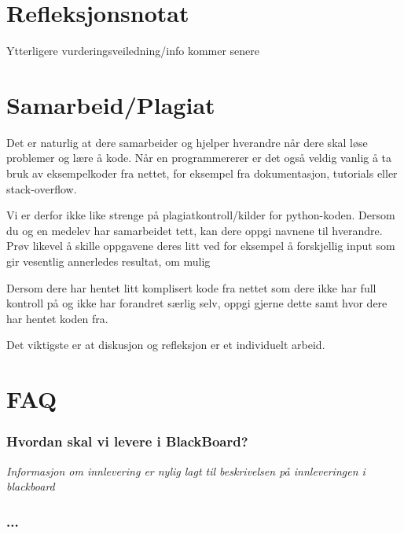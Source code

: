 \documentclass[12pt, titlepage]{article}
\begin{document}
\section*{Refleksjonsnotat}

Ytterligere vurderingsveiledning/info kommer senere

\section*{Samarbeid/Plagiat}

Det er naturlig at dere samarbeider og hjelper hverandre når dere skal løse problemer og lære å kode.
Når en programmererer er det også veldig vanlig å ta bruk av eksempelkoder fra nettet, for eksempel fra dokumentasjon, tutorials eller stack-overflow.

Vi er derfor ikke like strenge på plagiatkontroll/kilder for python-koden.  
Dersom du og en medelev har samarbeidet tett, kan dere oppgi navnene til hverandre. 
Prøv likevel å skille oppgavene deres litt ved for eksempel å forskjellig input som gir vesentlig annerledes resultat, om mulig

Dersom dere har hentet litt komplisert kode fra nettet som dere ikke har full kontroll på og ikke har forandret særlig selv,
oppgi gjerne dette samt hvor dere har hentet koden fra.

Det viktigste er at diskusjon og refleksjon er et individuelt arbeid.



\section*{FAQ}

\subsubsection*{Hvordan skal vi levere i BlackBoard?}
\textit{Informasjon om innlevering er nylig lagt til beskrivelsen på innleveringen i blackboard}

\subsubsection*{ ...}
\end{document}
